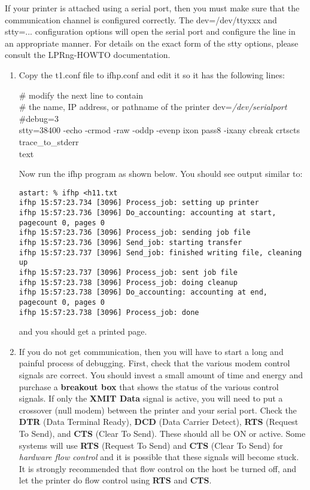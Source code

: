 \documentclass[a4paper]{article}
\begin{document}
If your printer is attached using a serial port,
then you must make sure that the communication channel is
configured correctly.
The
{\ttfamily dev=/dev/ttyxxx}
and
{\ttfamily stty=...}
configuration options will open the serial port
and configure the line in an appropriate manner.
For details on the exact form of the
{\ttfamily stty} options,
please consult the
LPRng-HOWTO documentation.
\begin{enumerate}
\item Copy the
{\ttfamily t1.conf}
file to
{\ttfamily ifhp.conf} and edit it
so it has the following lines:
\begin{tscreen}
\# modify the next line to contain \\ 
\#  the name, IP address, or pathname of the printer
dev={\itshape /dev/serialport \/}\\ 
\#debug=3 \\ 
stty=38400 -echo -crmod -raw -oddp -evenp ixon
pass8 -ixany cbreak crtscts
trace\_to\_stderr \\ 
text 
\end{tscreen}

Now run the
{\ttfamily ifhp}
program as shown below.
You should see output similar to:
\begin{tscreen}
\begin{verbatim}
astart: % ifhp <h11.txt
ifhp 15:57:23.734 [3096] Process_job: setting up printer
ifhp 15:57:23.736 [3096] Do_accounting: accounting at start, pagecount 0, pages 0
ifhp 15:57:23.736 [3096] Process_job: sending job file
ifhp 15:57:23.736 [3096] Send_job: starting transfer
ifhp 15:57:23.737 [3096] Send_job: finished writing file, cleaning up
ifhp 15:57:23.737 [3096] Process_job: sent job file
ifhp 15:57:23.738 [3096] Process_job: doing cleanup
ifhp 15:57:23.738 [3096] Do_accounting: accounting at end, pagecount 0, pages 0
ifhp 15:57:23.738 [3096] Process_job: done
\end{verbatim}
\end{tscreen}

and you should get a printed page.

\item If you do not get communication,
then you will have to start a long and painful process of debugging.
First,
check that the various modem control signals
are correct.
You should invest a small amount of time and energy and purchase
a
{\bfseries breakout box} that shows the status of the various control signals.
If only the
{\bfseries XMIT Data} signal is active,
you will need to put a crossover (null modem)
between the printer and your serial port.
Check the
{\bfseries DTR} (Data Terminal Ready),
{\bfseries DCD} (Data Carrier Detect),
{\bfseries RTS} (Request To Send),
and
{\bfseries CTS} (Clear To Send).
These should all be ON or active.
Some systems will use
{\bfseries RTS} (Request To Send)
and
{\bfseries CTS} (Clear To Send) for
{\itshape hardware flow control\/}
and it is possible that these signals will become stuck.
It is strongly recommended that flow control on the host be turned off,
and let the printer do flow control using 
{\bfseries RTS} and
{\bfseries CTS}.


\end{enumerate}
\end{document}
